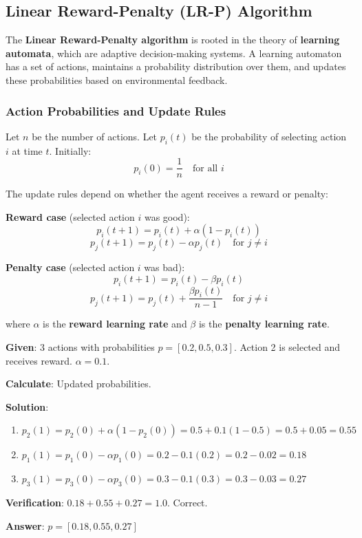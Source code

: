 \documentclass[11pt,a4paper]{article}
\begin{document}
\subsection{Linear Reward-Penalty (LR-P) Algorithm}

The \textbf{Linear Reward-Penalty algorithm} is rooted in the theory of \textbf{learning automata}, which are adaptive decision-making systems. A learning automaton has a set of actions, maintains a probability distribution over them, and updates these probabilities based on environmental feedback.

\subsubsection{Action Probabilities and Update Rules}

Let $n$ be the number of actions. Let $p_i(t)$ be the probability of selecting action $i$ at time $t$. Initially:
\[
p_i(0) = \frac{1}{n} \quad \text{for all } i
\]

The update rules depend on whether the agent receives a reward or penalty:

\textbf{Reward case} (selected action $i$ was good):
\[
p_i(t+1) = p_i(t) + \alpha(1 - p_i(t))
\]
\[
p_j(t+1) = p_j(t) - \alpha p_j(t) \quad \text{for } j \neq i
\]

\textbf{Penalty case} (selected action $i$ was bad):
\[
p_i(t+1) = p_i(t) - \beta p_i(t)
\]
\[
p_j(t+1) = p_j(t) + \frac{\beta p_i(t)}{n-1} \quad \text{for } j \neq i
\]

where $\alpha$ is the \textbf{reward learning rate} and $\beta$ is the \textbf{penalty learning rate}.

\begin{tcolorbox}[colback=blue!5!white,colframe=blue!75!black,title=\textbf{Worked Example 13: LR-P Probability Update -- Reward Case}]
\textbf{Given}: 3 actions with probabilities $p = [0.2, 0.5, 0.3]$. Action 2 is selected and receives reward. $\alpha = 0.1$.

\textbf{Calculate}: Updated probabilities.

\textbf{Solution}:
\begin{enumerate}
    \item $p_2(1) = p_2(0) + \alpha(1 - p_2(0)) = 0.5 + 0.1(1 - 0.5) = 0.5 + 0.05 = 0.55$
    \item $p_1(1) = p_1(0) - \alpha p_1(0) = 0.2 - 0.1(0.2) = 0.2 - 0.02 = 0.18$
    \item $p_3(1) = p_3(0) - \alpha p_3(0) = 0.3 - 0.1(0.3) = 0.3 - 0.03 = 0.27$
\end{enumerate}

\textbf{Verification}: $0.18 + 0.55 + 0.27 = 1.0$. Correct.

\textbf{Answer}: $p = [0.18, 0.55, 0.27]$
\end{tcolorbox}
\end{document}
